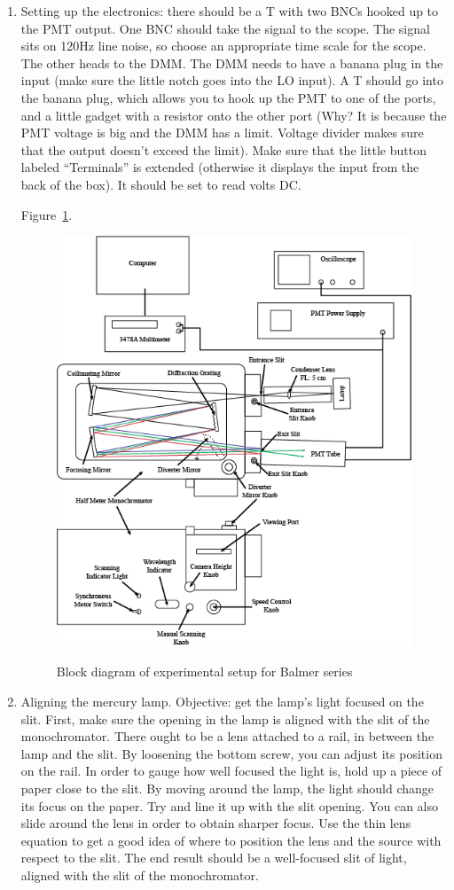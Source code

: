 \documentclass{../lab}
\begin{document}
\begin{enumerate}
    \item Setting up the electronics: there should be a T with two BNCs hooked up to the PMT output. One BNC should take the signal to the scope. The signal sits on 120Hz line noise, so choose an appropriate time scale for the scope. The other heads to the DMM. The DMM needs to have a banana plug in the input (make sure the little notch goes into the LO input). A T should go into the banana plug, which allows you to hook up the PMT to one of the ports, and a little gadget with a resistor onto the other port (Why? It is because the PMT voltage is big and the DMM has a limit. Voltage divider makes sure that the output doesn't exceed the limit). Make sure that the little button labeled ``Terminals'' is extended (otherwise it displays the input from the back of the box). It should be set to read volts DC.
    
    Figure~\ref{fig:Monochromator}. 
    \begin{figure}[h]
        \centering
        \href{http://experimentationlab.berkeley.edu/sites/default/files/ATM/Monochromator.png}{\includegraphics[width=0.5\linewidth]{images/Monochromator.png}}
        \caption{Block diagram of experimental setup for Balmer series}
        \label{fig:Monochromator}
    \end{figure}
    
    
    

    \item Aligning the mercury lamp. Objective: get the lamp's light focused on the slit. First, make sure the opening in the lamp is aligned with the slit of the monochromator. There ought to be a lens attached to a rail, in between the lamp and the slit. By loosening the bottom screw, you can adjust its position on the rail. In order to gauge how well focused the light is, hold up a piece of paper close to the slit. By moving around the lamp, the light should change its focus on the paper. Try and line it up with the slit opening. You can also slide around the lens in order to obtain sharper focus. Use the thin lens equation to get a good idea of where to position the lens and the source with respect to the slit. The end result should be a well-focused slit of light, aligned with the slit of the monochromator.
    

\end{enumerate}
\end{document}
